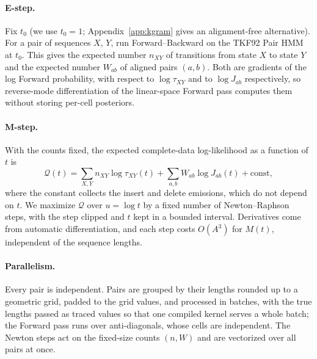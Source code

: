 \documentclass[11pt]{article}
\begin{document}
\paragraph{E-step.} Fix $t_0$ (we use $t_0=1$; Appendix~\ref{app:kgram}
gives an alignment-free alternative). For a pair of sequences $X$, $Y$, run
Forward--Backward on the TKF92 Pair HMM at $t_0$. This gives the expected number
$n_{XY}$ of transitions from state $X$ to state $Y$ and the expected number
$W_{ab}$ of aligned pairs $(a,b)$. Both are gradients of the log Forward
probability, with respect to $\log\tau_{XY}$ and to $\log J_{ab}$
respectively, so reverse-mode differentiation of the linear-space Forward
pass computes them without storing per-cell posteriors.

\paragraph{M-step.} With the counts fixed, the expected complete-data
log-likelihood as a function of $t$ is
\begin{equation}\label{eq:qt}
\mathcal Q(t)=\sum_{X,Y}n_{XY}\log\tau_{XY}(t)+\sum_{a,b}W_{ab}\log J_{ab}(t)
+\text{const},
\end{equation}
where the constant collects the insert and delete emissions, which do not
depend on $t$. We maximize $\mathcal Q$ over $u=\log t$ by a fixed number of
Newton--Raphson steps, with the step clipped and $t$ kept in a bounded
interval. Derivatives come from automatic differentiation, and each step
costs $O(A^3)$ for $M(t)$, independent of the sequence lengths.

\paragraph{Parallelism.} Every pair is independent. Pairs are grouped by
their lengths rounded up to a geometric grid, padded to the grid values, and
processed in batches, with the true lengths passed as traced values so that
one compiled kernel serves a whole batch; the Forward pass runs over
anti-diagonals, whose cells are independent. The Newton steps act on the
fixed-size counts $(n,W)$ and are vectorized over all pairs at once.
\end{document}
